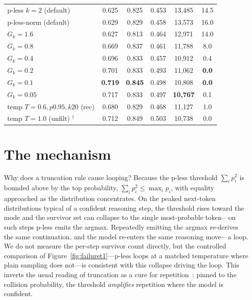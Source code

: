 \documentclass[11pt]{article}                       %
\newcommand{\tsum}{\ensuremath{\textstyle\sum}}
\begin{document}
\begin{table}[t]
\begin{tabular}{lccccc}
p-less $k{=}2$ (default) & 0.625 & 0.825 & 0.453 & 13{,}485 & 14.5 \\
p-less-norm (default)    & 0.629 & 0.829 & 0.458 & 13{,}573 & 16.0 \\
$G_k{=}1.6$              & 0.627 & 0.813 & 0.464 & 12{,}971 & 14.0 \\
$G_k{=}0.8$              & 0.669 & 0.837 & 0.461 & 11{,}788 & 8.0 \\
$G_k{=}0.4$              & 0.696 & 0.833 & 0.457 & 10{,}912 & 0.4 \\
$G_k{=}0.2$              & 0.701 & 0.833 & 0.493 & 11{,}062 & \textbf{0.0} \\
$G_k{=}0.1$              & \textbf{0.719} & \textbf{0.845} & 0.498 & 10{,}808 & \textbf{0.0} \\
$G_k{=}0.05$            & 0.717 & 0.833 & 0.497 & \textbf{10{,}767} & 0.1 \\
temp $T{=}0.6,p0.95,k20$ (rec) & 0.680 & 0.829 & 0.468 & 11{,}127 & 1.0 \\
temp $T{=}1.0$ (unfilt) $^\dagger$ & 0.712 & 0.849 & 0.503 & 10{,}738 & 0.0 \\
\bottomrule
\end{tabular}
\end{table}

\section{The mechanism}\label{sec:mech}
Why does a truncation rule cause looping? Because the p-less threshold $\tsum_i p_i^2$ is bounded above
by the top probability, $\tsum_i p_i^2 \le \max_i p_i$, with equality approached as the distribution
concentrates. On the peaked next-token distributions typical of a confident reasoning step, the
threshold rises toward the mode and the survivor set can collapse to the single most-probable
token---on such steps p-less emits the argmax. Repeatedly emitting the argmax re-derives the same
continuation, and the model re-enters the same reasoning move---a loop. We do not measure the per-step
survivor count directly, but the controlled comparison of Figure~\ref{fig:failuret1}---p-less loops at
a matched temperature where plain sampling does not---is consistent with this collapse driving the
loop. This inverts the usual reading of truncation as a cure for repetition~\citep{holtzman2020curious}:
pinned to the collision probability, the threshold \emph{amplifies} repetition where the model is confident.
\end{document}
